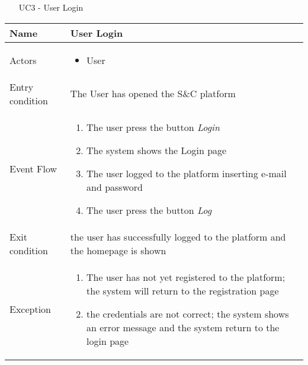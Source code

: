 			\begin{table} [H]
				\centering
					\begin{itemize}
					\item [UC3] - User Login
				\end{itemize}
				\begin{tabular}{|| P{7.5cm} | P{7.5cm} ||}
					\hline
					Name & User Login \\
					\hline
					Actors & \parbox{5cm}{\begin{itemize}
							\item User
						\end{itemize}
					} \\
					\hline
					Entry condition & The User has opened the S\&C platform \\
					\hline
					Event Flow & \parbox{5cm}{\begin{enumerate}[label=\alpha]
							\item The user press the button \textit{Login}
							\item The system shows the Login page
							\item The user logged to the platform 
							inserting e-mail and password 
							\item The user press the button \textit{Log}
					\end{enumerate}} \\
					\hline 
					Exit condition & the user has successfully logged to the 
					platform and the homepage is shown \\
					\hline
					Exception & \parbox{5cm}{\begin{enumerate}
							\item The user has not yet registered to the 
							platform; the system will return to the 
							registration page
							\item the credentials are not correct; the system shows an error message and the system return to the login page
							\end{enumerate}} \\
					\hline
				\end{tabular}
			\end{table}
			
		
			
